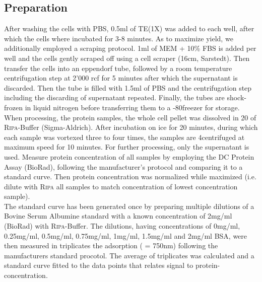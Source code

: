 \subsection{Preparation}
After washing the cells with PBS, 0.5ml of TE(1X) was added to each well, after which the cells where incubated for 3-8 minutes. As to maximize yield, we additionally employed a scraping protocol. 1ml of MEM\textalpha{} + 10\% FBS is added per well and the cells gently scraped off using a cell scraper (16cm, Sarstedt). Then transfer the cells into an eppendorf tube, followed by a room temperature centrifugation step at 2'000 rcf for 5 minutes after which the supernatant is discarded. Then the tube is filled with 1.5ml of PBS and the centrifugation step including the discarding of supernatant repeated. Finally, the tubes are shock-frozen in liquid nitrogen before transferring them to a -80\degC freezer for storage. When processing, the protein samples, the whole cell pellet was dissolved in 20\mul{} of \textsc{Ripa}-Buffer (Sigma-Aldrich). After incubation on ice for 20 minutes, during which each sample was vortexed three to four times, the samples are 4\degC centrifuged at maximum speed for 10 minutes. For further processing, only the supernatant is used. Measure protein concentration of all samples by employing the DC\texttrademark{} Protein Assay (BioRad), following the manufacturer's protocol and comparing it to a standard curve. Then protein concentration was normalized while maximized (i.e. dilute with \textsc{Ripa} all samples to match concentration of lowest concentration sample). \\
The standard curve has been generated once by preparing multiple dilutions of a Bovine Serum Albumine standard with a known concentration of 2mg/ml (BioRad) with \textsc{Ripa}-Buffer. The dilutions, having concentrations of 0mg/ml, 0.25mg/ml, 0.5mg/ml, 0.75mg/ml, 1mg/ml, 1.5mg/ml and 2mg/ml BSA, were then measured in triplicates the adsorption (\textlambda{} = 750nm) following the manufacturers standard procotol. The average of triplicates was calculated and a standard curve fitted to the data points that relates signal to protein-concentration. 

